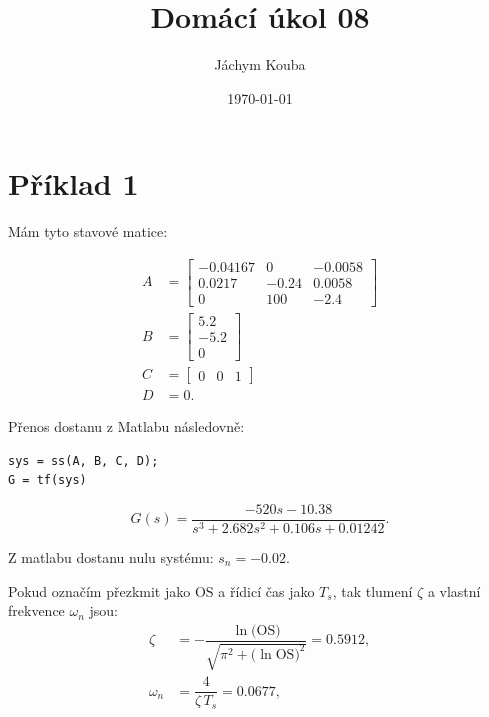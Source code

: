 \documentclass[12pt]{article}
\title{Domácí úkol 08}
\author{Jáchym Kouba}
\date{\today}
\begin{document}
\maketitle

\newpage

\section{Příklad 1}

Mám tyto stavové matice:

\begin{equation}
\begin{aligned}
A &= \begin{bmatrix}
-0.04167 & 0 & -0.0058 \\
0.0217 & -0.24 & 0.0058 \\
0 & 100 & -2.4
\end{bmatrix} \\
B &= \begin{bmatrix}
5.2 \\
-5.2 \\
0
\end{bmatrix} \\
C &= \begin{bmatrix}
0 & 0 & 1
\end{bmatrix} \\
D &= 0.
\end{aligned}
\end{equation}

Přenos dostanu z Matlabu následovně:

\begin{verbatim}
sys = ss(A, B, C, D);
G = tf(sys)
\end{verbatim}

\begin{equation}
G(s) = \frac{-520 s - 10.38}{s^3 + 2.682 s^2 + 0.106 s + 0.01242}.
\end{equation}

Z matlabu dostanu nulu systému: $s_n = -0.02$.

Pokud označím přezkmit jako $\mathrm{OS}$ a řídicí čas jako $T_s$, tak tlumení
\(\zeta\) a vlastní frekvence \(\omega_n\) jsou:
\begin{equation}\label{eq:params}
\begin{aligned}
\zeta &= -\dfrac{\ln\bigl(\mathrm{OS}\bigr)}{\sqrt{\pi^2 + \bigl(\ln\mathrm{OS}\bigr)^2}} = 0.5912, \\[6pt]
\omega_n &= \dfrac{4}{\zeta\,T_s} = 0.0677, \\[6pt]
\end{aligned}
\end{equation}
\end{document}
